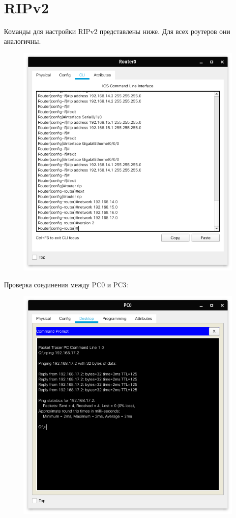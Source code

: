 \section{RIPv2}%
Команды для настройки RIPv2 представлены ниже. Для всех роутеров они аналогичны.
\begin{figure}[H]
    \centering
    \includegraphics[width=0.8\linewidth]{images/scr03.png}
    \caption{}%
\end{figure}
Проверка соединения между PC0 и PC3:
\begin{figure}[H]
    \centering
    \includegraphics[width=0.8\linewidth]{images/scr04.png}
    \caption{}%
\end{figure}

